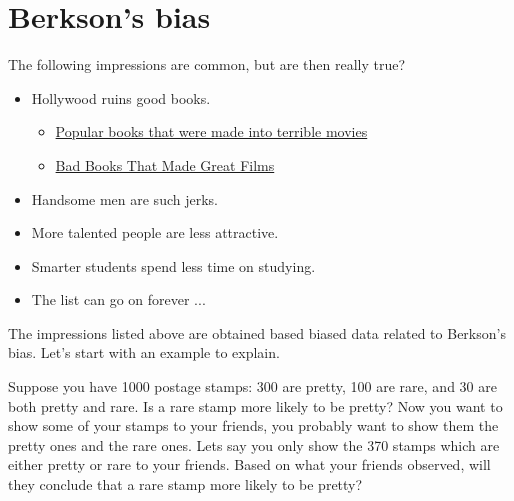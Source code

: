 \hypertarget{data}{%
\section{Berkson's bias}\label{berkson-bias}}

The following impressions are common, but are then really true?
  \begin{itemize}
  \item Hollywood ruins good books.
    \begin{itemize}
    \item \href{https://www.yardbarker.com/entertainment/articles/popular_books_that_were_made_into_terrible_movies/s1__29971472}{Popular books that were made into terrible movies}
    \item \href{https://www.cinelinx.com/movie-news/movie-stuff/bad-books-that-made-great-films/}{Bad Books That Made Great Films} 
    \end{itemize}
  \item Handsome men are such jerks.
  \item More talented people are less attractive.
  \item Smarter students spend less time on studying. 
  \item The list can go on forever ...
  \end{itemize}
The impressions listed above are obtained based biased data related to Berkson's bias. Let's start with an example to explain. 
\begin{example}
  Suppose you have 1000 postage stamps: 300 are pretty, 100 are rare, and 30 are both pretty and rare. Is a rare stamp more likely to be pretty? 
Now you want to show some of your stamps to your friends, you probably want to show them the pretty ones and the rare ones. Lets say you only show the 370 stamps which are either pretty or rare to your friends. Based on what your friends observed, will they conclude that a rare stamp more likely to be pretty?
\end{example}

